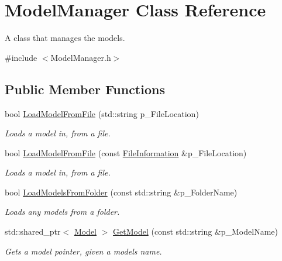 \hypertarget{class_model_manager}{}\section{Model\+Manager Class Reference}
\label{class_model_manager}


A class that manages the models.  




{\ttfamily \#include $<$Model\+Manager.\+h$>$}

\subsection*{Public Member Functions}
\begin{DoxyCompactItemize}
\item 
bool \mbox{\hyperlink{class_model_manager_abda1bb8020099cec8f025d76e022c42c}{Load\+Model\+From\+File}} (std\+::string p\+\_\+\+File\+Location)
\begin{DoxyCompactList}\small\item\em Loads a model in, from a file. \end{DoxyCompactList}\item 
bool \mbox{\hyperlink{class_model_manager_a571ee1560b3d25da728c9904ddd37bcc}{Load\+Model\+From\+File}} (const \mbox{\hyperlink{struct_file_information}{File\+Information}} \&p\+\_\+\+File\+Location)
\begin{DoxyCompactList}\small\item\em Loads a model in, from a file. \end{DoxyCompactList}\item 
bool \mbox{\hyperlink{class_model_manager_ab94a71bd3c3a8c9546947686861e1d8b}{Load\+Models\+From\+Folder}} (const std\+::string \&p\+\_\+\+Folder\+Name)
\begin{DoxyCompactList}\small\item\em Loads any models from a folder. \end{DoxyCompactList}\item 
std\+::shared\+\_\+ptr$<$ \mbox{\hyperlink{class_model}{Model}} $>$ \mbox{\hyperlink{class_model_manager_a9bb6cee3ce0f0665de35df41fe78a49d}{Get\+Model}} (const std\+::string \&p\+\_\+\+Model\+Name)
\begin{DoxyCompactList}\small\item\em Gets a model pointer, given a model\textquotesingle{}s name. \end{DoxyCompactList}\item 

\end{DoxyCompactItemize}
